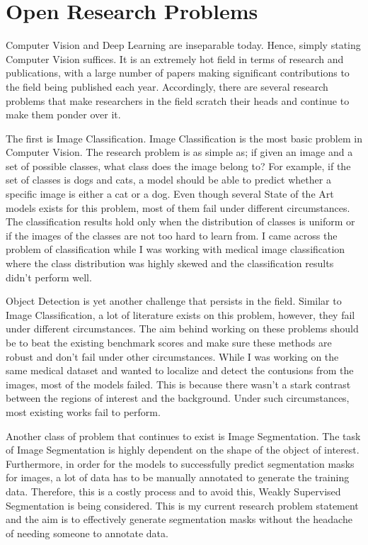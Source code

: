 \documentclass[11pt]{article}
\begin{document}
\section{Open Research Problems}
Computer Vision and Deep Learning are inseparable today. Hence, simply stating Computer Vision suffices. It is an extremely hot field in terms of research and publications, with a large number of papers making significant contributions to the field being published each year. Accordingly, there are several research problems that make researchers in the field scratch their heads and continue to make them ponder over it. \par
The first is Image Classification. Image Classification is the most basic problem in Computer Vision. The research problem is as simple as; if given an image and a set of possible classes, what class does the image belong to? For example, if the set of classes is dogs and cats, a model should be able to predict whether a specific image is either a cat or a dog. Even though several State of the Art models exists for this problem, most of them fail under different circumstances. The classification results hold only when the distribution of classes is uniform or if the images of the classes are not too hard to learn from. I came across the problem of classification while I was working with medical image classification where the class distribution was highly skewed and the classification results didn't perform well. \par 
Object Detection is yet another challenge that persists in the field. Similar to Image Classification, a lot of literature exists on this problem, however, they fail under different circumstances. The aim behind working on these problems should be to beat the existing benchmark scores and make sure these methods are robust and don't fail under other circumstances. While I was working on the same medical dataset and wanted to localize and detect the contusions from the images, most of the models failed. This is because there wasn't a stark contrast between the regions of interest and the background. Under such circumstances, most existing works fail to perform.\par 
Another class of problem that continues to exist is Image Segmentation. The task of Image Segmentation is highly dependent on the shape of the object of interest. Furthermore, in order for the models to successfully predict segmentation masks for images, a lot of data has to be manually annotated to generate the training data. Therefore, this is a costly process and to avoid this, Weakly Supervised Segmentation is being considered. This is my current research problem statement and the aim is to effectively generate segmentation masks without the headache of needing someone to annotate data. 
\end{document}
